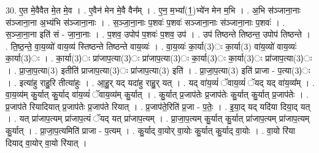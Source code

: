 \documentclass[17pt]{extarticle}
\begin{document}
30. ए॒त मे॒वैवैत मे॒त मे॒व । . ए॒वैन॑ मेन मे॒वै वैन᳚म् । . ए॒न॒ म॒भ्या᳚(1॒)भ्ये॑न मेन म॒भि । . अ॒भि स॑ञ्जाना॒नाः स॑ञ्जाना॒ना अ॒भ्य॑भि स॑ञ्जाना॒नाः । . स॒ञ्जा॒ना॒नाः प॒शवः॑ प॒शवः॑ सञ्जाना॒नाः स॑ञ्जाना॒नाः प॒शवः॑ । . स॒ञ्जा॒ना॒ना इति॑ सं - जा॒ना॒नाः । . प॒शव॒ उपोप॑ प॒शवः॑ प॒शव॒ उप॑ । . उप॑ तिष्ठन्ते तिष्ठन्त॒ उपोप॑ तिष्ठन्ते । . ति॒ष्ठ॒न्ते॒ वा॒य॒व्यो॑ वाय॒व्य॑ स्तिष्ठन्ते तिष्ठन्ते वाय॒व्यः॑ । . वा॒य॒व्यः॑ का॒र्या(3)ः का॒र्या(3) वा॑य॒व्यो॑ वाय॒व्यः॑ का॒र्या(3)ः । . का॒र्या(3)ः प्रा॑जाप॒त्या(3)ः प्रा॑जाप॒त्या(3)ः का॒र्या(3)ः का॒र्या(3)ः प्रा॑जाप॒त्या(3)ः । . प्रा॒जा॒प॒त्या(3) इतीति॑ प्राजाप॒त्या(3)ः प्रा॑जाप॒त्या(3) इति॑ । . प्रा॒जा॒प॒त्या(3) इति॑ प्राजा - प॒त्या(3)ः । . इत्या॑हु राहु॒रि तीत्या॑हुः । . आ॒हु॒र् यद् यदा॑हु राहु॒र् यत् । . यद् वा॑य॒व्यं॑ ॅवाय॒व्यं॑ ॅयद् यद् वा॑य॒व्य᳚म् । . वा॒य॒व्य॑म् कु॒र्यात् कु॒र्याद् वा॑य॒व्यं॑ ॅवाय॒व्य॑म् कु॒र्यात् । . कु॒र्यात् प्र॒जाप॑तेः प्र॒जाप॑तेः कु॒र्यात् कु॒र्यात् प्र॒जाप॑तेः । . प्र॒जाप॑ते रियादियात् प्र॒जाप॑तेः प्र॒जाप॑ते रियात् । . प्र॒जाप॑ते॒रिति॑ प्र॒जा - प॒तेः॒ । . इ॒या॒द् यद् यदि॑या दिया॒द् यत् । . यत् प्रा॑जाप॒त्यम् प्रा॑जाप॒त्यं ॅयद् यत् प्रा॑जाप॒त्यम् । . प्रा॒जा॒प॒त्यम् कु॒र्यात् कु॒र्यात् प्रा॑जाप॒त्यम् प्रा॑जाप॒त्यम् कु॒र्यात् । . प्रा॒जा॒प॒त्यमिति॑ प्राजा - प॒त्यम् । . कु॒र्याद् वा॒योर् वा॒योः कु॒र्यात् कु॒र्याद् वा॒योः । . वा॒यो रि॑या दियाद् वा॒योर् वा॒यो रि॑यात् । \newline
\end{document}

